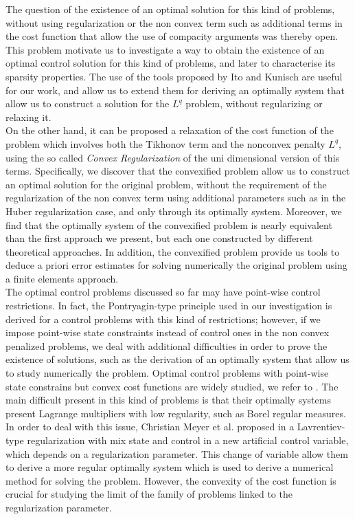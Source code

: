 The question of the existence of an optimal solution for this kind of problems, without using regularization or the non convex term such as additional terms in the cost function that allow the use of compacity arguments was thereby open. This problem motivate us to investigate a way to obtain the existence of an optimal control solution for this kind of problems, and later to characterise its sparsity properties. The use of the tools proposed by Ito and Kunisch are useful for our work, and allow us to extend them for deriving an optimally system that allow us to construct a solution for the $L^q$ problem, without regularizing or relaxing it.\\

On the other hand, it can be proposed a relaxation of the cost function of the problem which involves both the Tikhonov term and the nonconvex penalty $L^q$, using the so called  \textit{Convex Regularization} of the uni dimensional version of this terms. Specifically, we discover that the convexified problem allow us to construct an optimal solution for the original problem, without the requirement of the regularization of the non convex term using additional parameters such as in the Huber regularization case, and only through its optimally system. Moreover, we find that the optimally system of the convexified problem is nearly equivalent than the first approach we present, but each one constructed by different theoretical approaches. In addition, the convexified problem provide us tools to deduce a priori error estimates for solving numerically the original problem using a finite elements approach.\\

The optimal control problems discussed so far may have point-wise control restrictions. In fact, the Pontryagin-type principle used in our investigation is derived for a control problems with this kind of restrictions; however, if we impose point-wise state constraints instead of control ones in the non convex penalized problems, we deal with additional difficulties in order to prove the existence of solutions, such as the derivation of an optimally system that allow us to study numerically the problem. Optimal control problems with point-wise state constrains but convex cost functions are widely studied, we refer to \cite{casas, casas-clason-kunisch2012, casas-delosreyes}. The main difficult present in this kind of problems is that their optimally systems present Lagrange multipliers with low regularity, such as Borel regular measures. In order to deal with this issue, Christian Meyer et al. proposed in \cite{meyer-2007} a Lavrentiev-type regularization with mix state and control in a new artificial control variable, which depends on a regularization parameter. This change of variable allow them to derive a more regular optimally system which is used to derive a numerical method for solving the problem. However, the convexity of the cost function is crucial for studying the limit of the family of problems linked to the regularization parameter.\\

